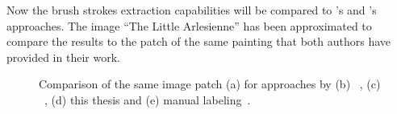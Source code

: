Now the brush strokes extraction capabilities will be compared to \citeauthor*{rhythmic}'s and \citeauthor*{lamberti}'s approaches.
The image ``The Little Arlesienne'' has been approximated to compare the results to the patch of the same painting that both authors have provided in their work.
\begin{figure}[!htp]
    \caption{Comparison of the same image patch (a) for approaches by (b) \citeauthor*{rhythmic}~\cite{rhythmic}, (c) \citeauthor*{lamberti}~\cite{lamberti}, (d) this thesis and (e) manual labeling~\cite{rhythmic}.}
\end{figure}
